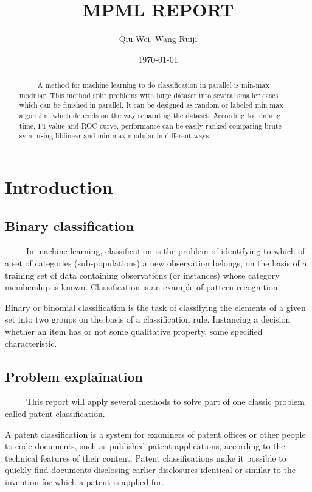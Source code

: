 \documentclass[11pt]{article}
\author{Qiu Wei, Wang Ruiji}
\date{\today}
\title{MPML REPORT}
\begin{document}
\maketitle
\tableofcontents

\begin{abstract}
\ \ \ \ \ A method for machine learning to do classification in parallel is min-max modular. This method split problems with huge dataset into several smaller cases which can be finished in parallel. It can be designed as random or labeled min max algorithm which depends on the way separating the dataset. According to running time, F1 value and ROC curve, performance can be easily ranked comparing brute svm, using liblinear and min max modular in different ways.
\end{abstract}

\section{Introduction}
\label{sec-1}

\subsection{Binary classification}
\label{sec-1-1}
\ \ \ \ \ In machine learning, classification is the problem of identifying to which of a set of categories (sub-populations) a new observation belongs, on the basis of a training set of data containing observations (or instances) whose category membership is known. Classification is an example of pattern recognition.

Binary or binomial classification is the task of classifying the elements of a given set into two groups on the basis of a classification rule. Instancing a decision whether an item has or not some qualitative property, some specified characteristic.

\subsection{Problem explaination}
\label{sec-1-2}
\ \ \ \ \ This report will apply several methods to solve part of one classic problem called patent classification.

A patent classification is a system for examiners of patent offices or other people to code documents, such as published patent applications, according to the technical features of their content. Patent classifications make it possible to quickly find documents disclosing earlier disclosures identical or similar to the invention for which a patent is applied for.
\end{document}
